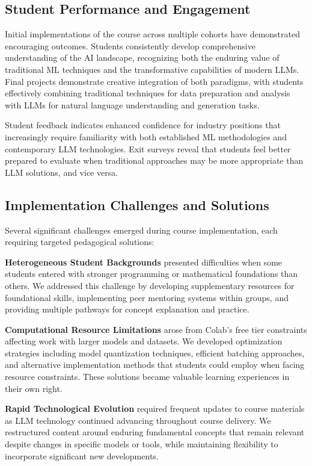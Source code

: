 \documentclass{article}
\begin{document}
\subsection{Student Performance and Engagement}

Initial implementations of the course across multiple cohorts have demonstrated encouraging outcomes. Students consistently develop comprehensive understanding of the AI landscape, recognizing both the enduring value of traditional ML techniques and the transformative capabilities of modern LLMs. Final projects demonstrate creative integration of both paradigms, with students effectively combining traditional techniques for data preparation and analysis with LLMs for natural language understanding and generation tasks.

Student feedback indicates enhanced confidence for industry positions that increasingly require familiarity with both established ML methodologies and contemporary LLM technologies. Exit surveys reveal that students feel better prepared to evaluate when traditional approaches may be more appropriate than LLM solutions, and vice versa.

\subsection{Implementation Challenges and Solutions}

Several significant challenges emerged during course implementation, each requiring targeted pedagogical solutions:

\textbf{Heterogeneous Student Backgrounds} presented difficulties when some students entered with stronger programming or mathematical foundations than others. We addressed this challenge by developing supplementary resources for foundational skills, implementing peer mentoring systems within groups, and providing multiple pathways for concept explanation and practice.

\textbf{Computational Resource Limitations} arose from Colab's free tier constraints affecting work with larger models and datasets. We developed optimization strategies including model quantization techniques, efficient batching approaches, and alternative implementation methods that students could employ when facing resource constraints. These solutions became valuable learning experiences in their own right.

\textbf{Rapid Technological Evolution} required frequent updates to course materials as LLM technology continued advancing throughout course delivery. We restructured content around enduring fundamental concepts that remain relevant despite changes in specific models or tools, while maintaining flexibility to incorporate significant new developments.
\end{document}
